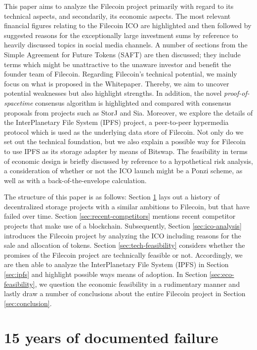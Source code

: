 \documentclass[conference]{IEEEtran}
\begin{document}
This paper aims to analyze the Filecoin project primarily with regard to its technical aspects, and secondarily, its economic aspects.
The most relevant financial figures relating to the Filecoin ICO are highlighted and then followed by suggested reasons for the exceptionally large investment sums by reference to heavily discussed topics in social media channels.
A number of sections from the Simple Agreement for Future Tokens (SAFT) are then discussed; they include terms which might be unattractive to the unaware investor and benefit the founder team of Filecoin.
Regarding Filecoin's technical potential, we mainly focus on what is proposed in the Whitepaper\cite{filecoin}.
Thereby, we aim to uncover potential weaknesses but also highlight strengths.
In addition, the novel \textit{proof-of-spacetime} consensus algorithm is highlighted and compared with consensus proposals from projects such as StorJ and Sia.
Moreover, we explore  the details of the InterPlanetary File System (IPFS) project, a peer-to-peer hypermedia protocol which is used as the underlying data store of Filecoin.
Not only do we set out the technical foundation, but we also explain a possible way for Filecoin to use IPFS as its storage adapter by means of Bitswap\cite{bitswap}.
The feasibility in terms of economic design is briefly discussed by reference to a hypothetical risk analysis, a consideration of whether or not the ICO launch might be a Ponzi scheme, as well as with a back-of-the-envelope calculation.

The structure of this paper is as follows: Section \ref{sec:documented-failure} lays out a history of decentralized storage projects with a similar ambitions to Filecoin, but that have failed over time. 
Section \ref{sec:recent-competitors} mentions recent competitor projects that make use of a blockchain.
Subsequently, Section \ref{sec:ico-analysis} introduces the Filecoin project by analyzing the ICO including reasons for the sale and allocation of tokens.
Section \ref{sec:tech-feasibility} considers whether the promises of the Filecoin project are technically feasible or not.
Accordingly, we are then able to analyze the InterPlanetary File System (IPFS)\cite{ipfs-whitepaper} in Section \ref{sec:ipfs} and highlight possible ways means of adoption.
In Section \ref{sec:eco-feasibility}, we question the economic feasibility in a rudimentary manner and lastly draw a number of conclusions about the entire Filecoin project in Section \ref{sec:conclusion}.


\section{15 years of documented failure}
\label{sec:documented-failure}
\end{document}
